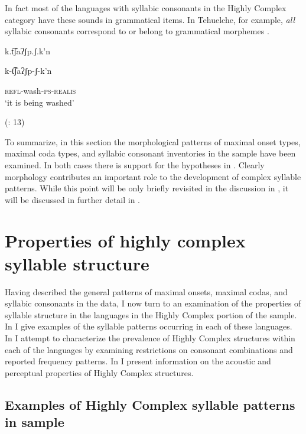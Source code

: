   In fact most of the languages with syllabic consonants in the Highly Complex category have these sounds in grammatical items. In Tehuelche, for example, \textit{all} syllabic consonants correspond to or belong to grammatical morphemes .

\ea\label{ex:3.26}

k.t͡ʃaʔʃp.ʃ.k’n

k-t͡ʃaʔʃp-ʃ-k’n

\textsc{refl}-wash-\textsc{ps-realis}\\
\glt ‘it is being washed’

(\citealt{FernándezGarayHernández2006}: 13)
\z

  To summarize, in this section the morphological patterns of maximal onset types, maximal coda types, and syllabic consonant inventories in the sample have been examined. In both cases there is support for the hypotheses in . Clearly morphology contributes an important role to the development of complex syllable patterns. While this point will be only briefly revisited in the discussion in , it will be discussed in further detail in .

\section{Properties of highly complex syllable structure}\label{sec:3.4}

  Having described the general patterns of maximal onsets, maximal codas, and syllabic consonants in the data, I now turn to an examination of the properties of syllable structure in the languages in the Highly Complex portion of the sample. In  I give examples of the syllable patterns occurring in each of these languages. In  I attempt to characterize the prevalence of Highly Complex structures within each of the languages by examining restrictions on consonant combinations and reported frequency patterns. In  I present information on the acoustic and perceptual properties of Highly Complex structures.

\subsection{Examples of Highly Complex syllable patterns in sample}\label{sec:3.4.1}

